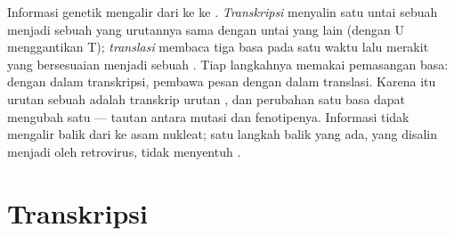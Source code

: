 \begin{proposition}\label{prop:b1:gene-expression:dogma}
Informasi genetik mengalir dari  ke  ke .
\emph{Transkripsi} menyalin satu untai sebuah  menjadi sebuah 
yang urutannya sama dengan untai yang lain (dengan U menggantikan T);
\emph{translasi} membaca  tiga basa pada satu waktu
lalu merakit  yang bersesuaian menjadi sebuah .
Tiap langkahnya memakai pemasangan basa:  dengan  dalam
transkripsi, pembawa pesan dengan  dalam translasi. Karena
itu urutan sebuah  adalah transkrip urutan , dan perubahan
satu basa dapat mengubah satu  --- tautan antara mutasi dan
fenotipenya. Informasi tidak mengalir balik dari  ke asam
nukleat; satu langkah balik yang ada,  yang disalin menjadi  oleh
retrovirus, tidak menyentuh .
\end{proposition}

\section{Transkripsi}

